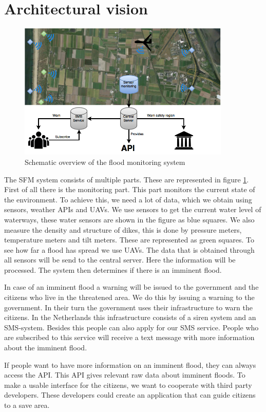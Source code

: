 \section{Architectural vision}
\label{sec:archvision}
\begin{figure}[H]
	\includegraphics[keepaspectratio=true,width=0.9\textwidth]{images/archVision.png}
	\caption{Schematic overview of the flood monitoring system}
	\label{fig:architectural-vision}
\end{figure}

The \gls{SFM} system consists of multiple parts. These are represented in figure \ref{fig:architectural-vision}. First of all there is the monitoring part. This part monitors the current state of the environment. To achieve this, we need a lot of data, which we obtain using sensors, weather \gls{API}s and \gls{UAV}s. We use sensors to get the current water level of waterways, these water sensors are shown in the figure as blue squares. We also measure the density and structure of dikes, this is done by pressure meters, temperature meters and tilt meters. These are represented as green squares. To see how far a flood has spread we use UAVs. The data that is obtained through all sensors will be send to the central server. Here the information will be processed. The system then determines if there is an imminent flood.

In case of an imminent flood a warning will be issued to the government and the citizens who live in the threatened area. We do this by issuing a warning to the government. In their turn the government uses their infrastructure to warn the citizens. In the Netherlands this infrastructure consists of a siren system and an SMS-system. Besides this people can also apply for our SMS service. People who are subscribed to this service will receive a text message with more information about the imminent flood. 

If people want to have more information on an imminent flood, they can always access the API. This API gives relevant raw data about imminent floods. To make a usable interface for the citizens, we want to cooperate with third party developers. These developers could create an application that can guide citizens to a save area.
